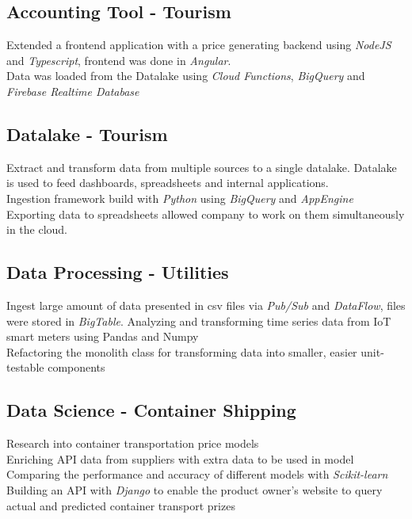 \documentclass{article}
\begin{document}
\subsection{Accounting Tool - Tourism}
Extended a frontend application with a price generating backend using \emph{NodeJS} and \emph{Typescript}, frontend was done in \emph{Angular}. \\
Data was loaded from the Datalake using \emph{Cloud Functions}, \emph{BigQuery} and \emph{Firebase Realtime Database} \\

\subsection{Datalake - Tourism}
Extract and transform data from multiple sources to a single datalake. Datalake is used to feed dashboards, spreadsheets and internal applications. \\
Ingestion framework build with \emph{Python} using \emph{BigQuery} and \emph{AppEngine} \\
Exporting data to spreadsheets allowed company to work on them simultaneously in the cloud. \\ 

\subsection{Data Processing - Utilities}
Ingest large amount of data presented in csv files via \emph{Pub/Sub} and \emph{DataFlow}, files were stored in \emph{BigTable}.
Analyzing and transforming time series data from IoT smart meters using Pandas and Numpy \\
Refactoring the monolith class for transforming data into smaller, easier unit-testable components \\

\subsection{Data Science - Container Shipping}
Research into container transportation price models \\
Enriching API data from suppliers with extra data to be used in model \\
Comparing the performance and accuracy of different models with \emph{Scikit-learn} \\
Building an API with \emph{Django} to enable the product owner's website to query actual and predicted container transport prizes \\
\end{document}
